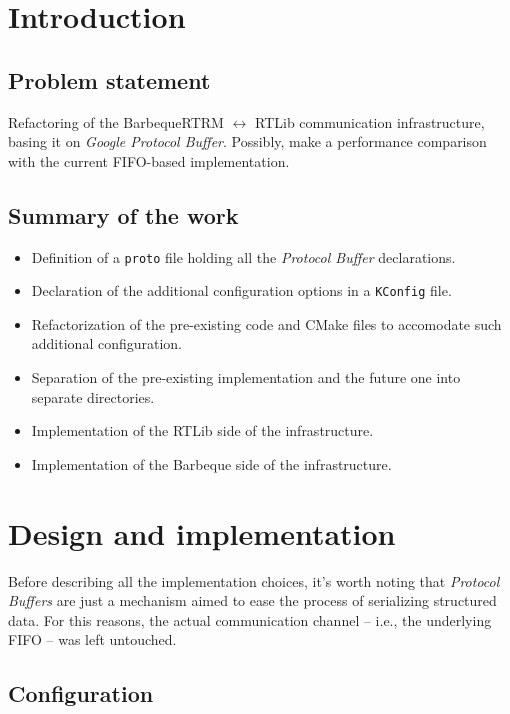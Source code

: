 \section{Introduction}

\subsection{Problem statement}
Refactoring of the BarbequeRTRM $\leftrightarrow$ RTLib communication infrastructure, basing it on \emph{Google Protocol Buffer}. Possibly, make a performance comparison with the current FIFO-based implementation.

\subsection{Summary of the work}
\begin{itemize}
    \item Definition of a \texttt{proto} file holding all the \emph{Protocol Buffer} declarations.
    \item Declaration of the additional configuration options in a \texttt{KConfig} file.
    \item Refactorization of the pre-existing code and CMake files to accomodate such additional configuration.
    \item Separation of the pre-existing implementation and the future one into separate directories.
    \item Implementation of the RTLib side of the infrastructure.
    \item Implementation of the Barbeque side of the infrastructure.
\end{itemize}

\newpage

\section{Design and implementation}

Before describing all the implementation choices, it's worth noting that \emph{Protocol Buffers} are just a mechanism aimed to ease the process of serializing structured data. For this reasons, the actual communication channel -- i.e., the underlying FIFO -- was left untouched.

\subsection{Configuration}

